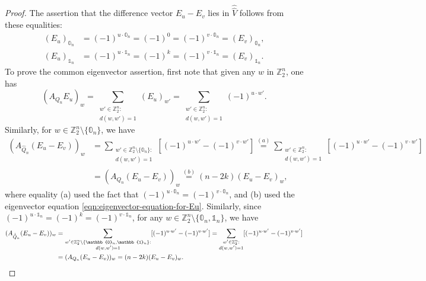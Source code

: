 \documentclass[10pt,a4paper]{amsart}
\newcommand{\ZZ}{\mathbb{Z}}
\newcommand{\one}{\mathbb{1}}
\newcommand{\zero}{\mathbb{0}}
\begin{document}
\begin{proof}
The assertion that the difference vector $E_u-E_v$
lies in $\hat{\hat{V}}$
follows from these equalities:
\begin{align*}
(E_u)_{\zero_n}&=(-1)^{u \cdot \zero_n}=(-1)^0=(-1)^{v \cdot \zero_n}=(E_v)_{\zero_n},\\
(E_u)_{\one_n}&=(-1)^{u \cdot \one_n}=(-1)^k=(-1)^{v \cdot \one_n} =(E_v)_{\one_n}.
\end{align*}
To prove the common eigenvector assertion, first note that given 
any $w$ in
$\ZZ_2^n$, one has
$$
(A_{Q_n} E_u)_w
=\sum_{\substack{w' \in \ZZ_2^n:\\
d(w,w')=1}} (E_u)_{w'}
=\sum_{\substack{w' \in \ZZ_2^n:\\
d(w,w')=1}} (-1)^{u \cdot w'}.
$$
Similarly, for \( w\in \ZZ_2^n \setminus \{\zero_n\} \), we have
\begin{align*}
(A_{\hat{Q}_n} (E_u-E_v))_w
&=\sum_{\substack{w' \in \ZZ_2^n \setminus \{\zero_n\}:\\
d(w,w')=1}}
[(-1)^{u \cdot w'}
- (-1)^{v \cdot w'}]
\overset{(a)}{=}\sum_{\substack{w' \in \ZZ_2^n:\\
d(w,w')=1}} 
[(-1)^{u \cdot w'}
- (-1)^{v \cdot w'}]\\
&=(A_{Q_n} (E_u-E_v))_w
\overset{(b)}{=}(n-2k) (E_u-E_v)_w,
\end{align*}
where equality (a) used the fact that $(-1)^{u \cdot \zero_n}=(-1)^{v \cdot \zero_n}$, and (b) used the eigenvector equation \eqref{eqn:eigenvector-equation-for-Eu}.  
Similarly, since $(-1)^{u \cdot \one_n}=(-1)^k=(-1)^{v \cdot \one_n}$, 
for any $w\in \ZZ_2^n \setminus \{\zero_n,\one_n\}$, we have
\begin{align*}
(A_{\hat{\hat{Q}}_n} (E_u-E_v))_w
&=\sum_{\substack{w' \in \ZZ_2^n \setminus \{\zero_n,\one_n\}:\\
d(w,w')=1}} 
[(-1)^{u \cdot w'}
- (-1)^{v \cdot w'}]
=\sum_{\substack{w' \in \ZZ_2^n:\\
d(w,w')=1}} 
[(-1)^{u \cdot w'}
- (-1)^{v \cdot w'}]\\
&=(A_{Q_n} (E_u-E_v))_w
=(n-2k) (E_u-E_v)_w. \qedhere
\end{align*}
\end{proof}
\end{document}

